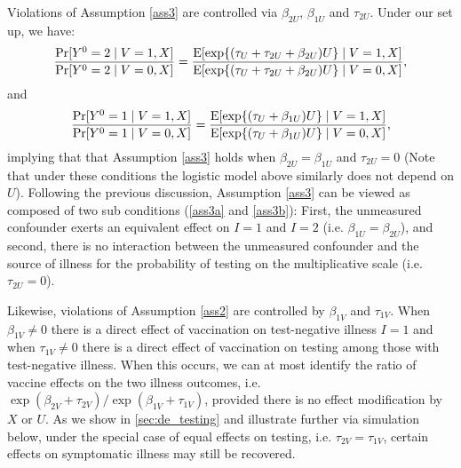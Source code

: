 \documentclass[11pt]{article}
\begin{document}
Violations of Assumption \ref{ass3} are controlled via $\beta_{2U}$, $\beta_{1U}$ and $\tau_{2U}$. Under our set up, we have:
\begin{align*}
    \dfrac{\Pr[Y^0=2 \mid V=1,X]}{\Pr[Y^0=2\mid V=0,X]}=\dfrac{\operatorname{E}[\exp\{(\tau_U  + \tau_{2U}+\beta_{2U})U\}\mid V=1, X]}{\operatorname{E}[\exp\{(\tau_U  + \tau_{2U}+\beta_{2U})U\}\mid V=0, X]},
\end{align*}
and 
\begin{align*}
    \dfrac{\Pr[Y^0=1 \mid V=1,X]}{\Pr[Y^0=1\mid V=0,X]}=\dfrac{\operatorname{E}[\exp\{(\tau_U  +\beta_{1U})U\}\mid V=1, X]}{\operatorname{E}[\exp\{(\tau_U +\beta_{1U})U\}\mid V=0, X]},
\end{align*}
implying that that Assumption \ref{ass3} holds when $\beta_{2U}=\beta_{1U}$ and $\tau_{2U}=0$ (Note that under these conditions the logistic model above similarly does not depend on $U$). Following the previous discussion, Assumption \ref{ass3} can be viewed as composed of two sub conditions (\ref{ass3a} and \ref{ass3b}): First, the unmeasured confounder exerts an equivalent effect on $I=1$ and $I=2$ (i.e. $\beta_{1U}=\beta_{2U}$), and second, there is no interaction between the unmeasured confounder and the source of illness for the probability of testing on the multiplicative scale (i.e. $\tau_{2U}=0$). 

Likewise, violations of Assumption \ref{ass2} are controlled by $\beta_{1V}$ and $\tau_{1V}$. When $\beta_{1V} \neq 0$ there is a direct effect of vaccination on test-negative illness $I = 1$ and when $\tau_{1V} \neq 0$ there is a direct effect of vaccination on testing among those with test-negative illness. When this occurs, we can at most identify the ratio of vaccine effects on the two illness outcomes, i.e. $\exp(\beta_{2V} + \tau_{2V})/\exp(\beta_{1V} + \tau_{1V})$, provided there is no effect modification by $X$ or $U$. As we show in \ref{sec:de_testing} and illustrate further via simulation below, under the special case of equal effects on testing, i.e. $\tau_{2V} = \tau_{1V}$, certain effects on symptomatic illness may still be recovered.  
\end{document}
